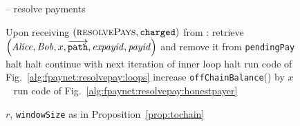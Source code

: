   \begin{figure}[H]
    \begin{systembox}{\fpaynet{} -- resolve payments}
      \begin{algorithmic}[1]
        \State Upon receiving $\left(\textsc{resolvePays},
        \mathtt{charged}\right)$ from \simulator:
        \Indent
              \label{alg:fpaynet:resolvepay:innerloop}
              \State retrieve $\left(\mathit{Alice}, \mathit{Bob}, x,
              \overrightarrow{\mathtt{path}}, \mathit{expayid},
              \mathit{payid}\right)$ and remove it from \texttt{pendingPay}
                \State halt
              \EndIf
              \If{$\dave{} = \bot$} 
              \label{alg:fpaynet:resolvepay:failed:if}
                \label{alg:fpaynet:resolvepay:failed:reported:if}
                  \State halt
                  \label{alg:fpaynet:resolvepay:failed:reported}
                \EndIf
                \State continue with next iteration of inner loop
                \label{alg:fpaynet:resolvepay:continue}
                \State halt 
                \label{alg:fpaynet:resolvepay:halt:path}
                \State run code of Fig.~\ref{alg:fpaynet:resolvepay:loops}
                \label{alg:fpaynet:resolvepay:corrupted:gotoloops}
                \State increase \texttt{offChainBalance}(\bob) by $x$
                \label{alg:fpaynet:resolvepay:corr:credit}
              \Else \ 
                \State run code of Fig.~\ref{alg:fpaynet:resolvepay:honestpayer}
              \EndIf
            \EndFor
          \EndFor
        \EndIndent
      \end{algorithmic}
    \end{systembox}
    \caption{$r$, \texttt{windowSize} as in Proposition~\ref{prop:tochain}}
    \label{alg:fpaynet:resolvepay}
  \end{figure}

